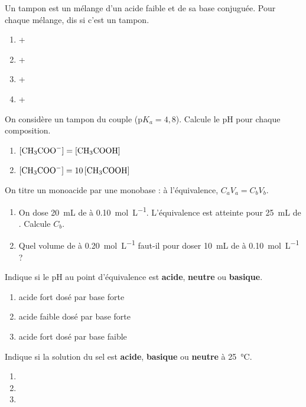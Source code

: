 \documentclass[11pt,a4paper]{article}
\begin{document}

\begin{exo}
Un tampon est un mélange d'un acide faible et de sa base conjuguée. Pour chaque mélange, dis si c'est un
tampon.
\begin{enumerate}[label=\alph*)]
  \item {} + 
  \item {} + 
  \item {} + 
  \item {} + 
\end{enumerate}
\end{exo}

\begin{exo}
On considère un tampon du couple  ($\mathrm{p}K_a = 4{,}8$). Calcule le pH pour chaque
composition.
\begin{enumerate}[label=\alph*)]
  \item $[\ce{CH3COO-}] = [\ce{CH3COOH}]$
  \item $[\ce{CH3COO-}] = 10\,[\ce{CH3COOH}]$
\end{enumerate}
\end{exo}

\begin{exo}
On titre un monoacide par une monobase : à l'équivalence, $C_a V_a = C_b V_b$.
\begin{enumerate}[label=\alph*)]
  \item On dose \qty{20}{mL} de  à \qty{0,10}{mol\per L}. L'équivalence est atteinte pour \qty{25}{mL}
        de . Calcule $C_b$.
  \item Quel volume de  à \qty{0,20}{mol\per L} faut-il pour doser \qty{10}{mL} de  à
        \qty{0,10}{mol\per L} ?
\end{enumerate}
\end{exo}

\begin{exo}
Indique si le pH au point d'équivalence est \textbf{acide}, \textbf{neutre} ou \textbf{basique}.
\begin{enumerate}[label=\alph*)]
  \item acide fort  dosé par base forte 
  \item acide faible  dosé par base forte 
  \item acide fort  dosé par base faible 
\end{enumerate}
\end{exo}

\begin{exo}
Indique si la solution du sel est \textbf{acide}, \textbf{basique} ou \textbf{neutre} à \qty{25}{\celsius}.
\begin{enumerate}[label=\alph*)]
  \item {}
  \item {}
  \item {}
\end{enumerate}
\end{exo}
\end{document}
